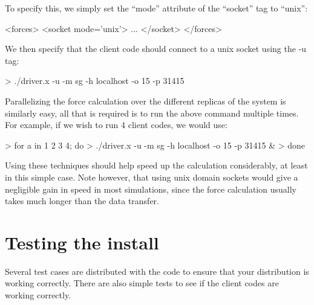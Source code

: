 \documentclass[11pt,english,fleqn]{report}
\newenvironment{code}{%
\footnotesize 
\verbatim
}{
\endverbatim
\normalsize
}
\begin{document}
To specify this, we simply set the {}``mode'' attribute of the
{}``socket'' tag to {}``unix'':

\begin{code}
<forces>
   <socket mode='unix'>
      ...
   </socket>
</forces>
\end{code}

We then specify that the client code should connect to a unix socket
using the -u tag:

\begin{code}
> ./driver.x -u -m sg -h localhost -o 15 -p 31415
\end{code}

Parallelizing the force calculation over the different replicas of the system
is similarly easy, all that is required is to run the above
command multiple times. For example, if we wish to run
4 client codes, we would use:

\begin{code}
> for a in 1 2 3 4; do
>    ./driver.x -u -m sg -h localhost -o 15 -p 31415 &
> done
\end{code}

Using these techniques should help speed up the calculation considerably,
at least in this simple case. Note however, that using unix domain sockets
would give a negligible gain in speed in most simulations, 
since the force calculation usually takes much longer than the data transfer. 

\section{Testing the install}

\label{tests}

Several test cases are distributed with the code to ensure that your
distribution is working correctly. There are also simple tests to
see if the client codes are working correctly.
\end{document}
